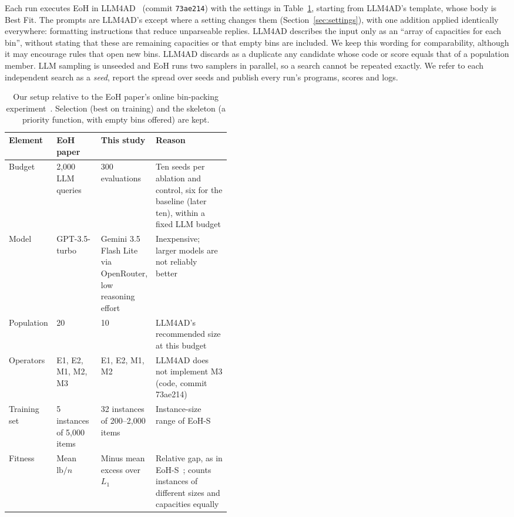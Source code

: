 \documentclass[10pt,twocolumn]{article}
\makeatletter
\renewcommand\subsection{\@startsection{subsection}{2}{\z@}{2.2ex \@plus .5ex \@minus .2ex}{1ex \@plus .2ex}{\normalfont\large\bfseries}}
\makeatother
\begin{document}
\subsection{Search and evaluation}
Each run executes EoH in LLM4AD~\citep{liu2026llm4ad} (commit \texttt{73ae214}) with the settings in Table~\ref{tab:eoh}, starting from LLM4AD's template, whose body is Best Fit. The prompts are LLM4AD's except where a setting changes them (Section~\ref{sec:settings}), with one addition applied identically everywhere: formatting instructions that reduce unparseable replies. LLM4AD describes the input only as an ``array of capacities for each bin'', without stating that these are remaining capacities or that empty bins are included. We keep this wording for comparability, although it may encourage rules that open new bins. LLM4AD discards as a duplicate any candidate whose code or score equals that of a population member. LLM sampling is unseeded and EoH runs two samplers in parallel, so a search cannot be repeated exactly. We refer to each independent search as a \emph{seed}, report the spread over seeds and publish every run's programs, scores and logs.

\begin{table}[t]
\centering\footnotesize
\caption{Our setup relative to the EoH paper's online bin-packing experiment~\citep{liu2024eoh}. Selection (best on training) and the skeleton (a priority function, with empty bins offered) are kept.}
\label{tab:eoh}
\begin{tabularx}{\linewidth}{@{}lp{0.2\linewidth}p{0.24\linewidth}X@{}}
\toprule
Element & EoH paper & This study & Reason\\
\midrule
Budget & 2,000 LLM queries & 300 evaluations & Ten seeds per ablation and control, six for the baseline (later ten), within a fixed LLM budget\\
Model & GPT-3.5-turbo & Gemini 3.5 Flash Lite via OpenRouter, low reasoning effort & Inexpensive; larger models are not reliably better~\citep{zhang2024eps,liu2026llm4ad}\\
Population & 20 & 10 & LLM4AD's recommended size at this budget\\
Operators & E1, E2, M1, M2, M3 & E1, E2, M1, M2 & LLM4AD does not implement M3 (code, commit 73ae214)\\
Training set & 5 instances of 5,000 items & 32 instances of 200--2,000 items & Instance-size range of EoH-S~\citep{liu2025eohs}\\
Fitness & Mean $\mathrm{lb}/n$ & Minus mean excess over $L_1$ & Relative gap, as in EoH-S~\citep{liu2025eohs}; counts instances of different sizes and capacities equally\\
\bottomrule
\end{tabularx}
\end{table}
\end{document}
